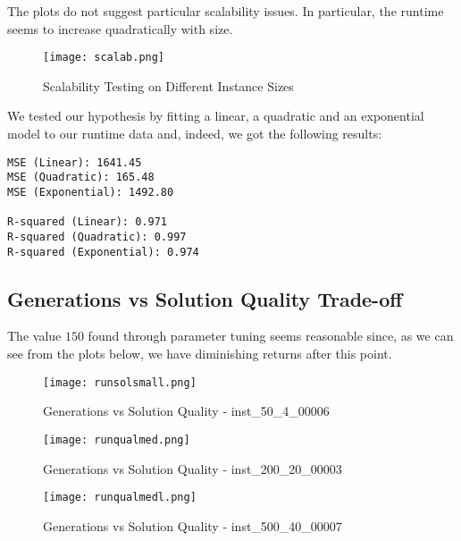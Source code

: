\documentclass{article}
\begin{document}
The plots do not suggest particular scalability issues. In particular, the runtime seems to increase quadratically with size. 

\begin{figure}[H]
    \centering
    \texttt{[image: scalab.png]}
    \caption{Scalability Testing on Different Instance Sizes}
    \label{fig:enter-label}
\end{figure}

We tested our hypothesis by fitting a linear, a quadratic and an exponential model to our runtime data and, indeed, we got the following results:

\begin{verbatim}
MSE (Linear): 1641.45
MSE (Quadratic): 165.48
MSE (Exponential): 1492.80

R-squared (Linear): 0.971
R-squared (Quadratic): 0.997
R-squared (Exponential): 0.974
\end{verbatim}

\subsection{Generations vs Solution Quality Trade-off}

The value $150$ found through parameter tuning seems reasonable since, as we can see from the plots below, we have diminishing returns after this point.

\begin{figure}[H]
    \centering
    \texttt{[image: runsolsmall.png]}
    \caption{Generations vs Solution Quality - inst\_50\_4\_00006}
    \label{fig:enter-label}
\end{figure}

\begin{figure}[H]
    \centering
    \texttt{[image: runqualmed.png]}
    \caption{Generations vs Solution Quality - inst\_200\_20\_00003}
    \label{fig:enter-label}
\end{figure}

\begin{figure}[H]
    \centering
    \texttt{[image: runqualmedl.png]}
    \caption{Generations vs Solution Quality - inst\_500\_40\_00007}
    \label{fig:enter-label}
\end{figure}
\end{document}
